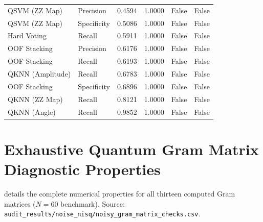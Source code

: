 \begin{longtable}{llcccc}
QSVM (ZZ Map)    & Precision   & 0.4594 & 1.0000 & False & False \\
QSVM (ZZ Map)    & Specificity & 0.5086 & 1.0000 & False & False \\
Hard Voting      & Recall      & 0.5911 & 1.0000 & False & False \\
OOF Stacking     & Precision   & 0.6176 & 1.0000 & False & False \\
OOF Stacking     & Recall      & 0.6193 & 1.0000 & False & False \\
QKNN (Amplitude) & Recall      & 0.6783 & 1.0000 & False & False \\
OOF Stacking     & Specificity & 0.6896 & 1.0000 & False & False \\
QKNN (ZZ Map)    & Recall      & 0.8121 & 1.0000 & False & False \\
QKNN (Angle)     & Recall      & 0.9852 & 1.0000 & False & False \\
\end{longtable}

\section{Exhaustive Quantum Gram Matrix Diagnostic Properties}
\label{app:gram-checks-full}

 details the complete numerical properties for all thirteen computed Gram matrices ($N=60$ benchmark). Source: \texttt{audit\_results/noise\_nisq/noisy\_gram\_matrix\_checks.csv}.

